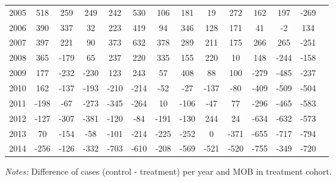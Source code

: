 \begin{table}[H]
\begin{threeparttable}
{\begin{tabular}{l*{13}{c}}
2005        &         518&         259&         249&         242&         530&         106&         181&          19&         272&         162&         197&        -269\\
2006        &         390&         337&          32&         223&         419&          94&         346&         128&         171&          41&          -2&         134\\
2007        &         397&         221&          90&         373&         632&         378&         289&         211&         175&         266&         265&        -251\\
2008        &         365&        -179&          65&         237&         220&         335&         155&         220&          10&         148&        -244&        -158\\
2009        &         177&        -232&        -230&         123&         243&          57&         408&          88&         100&        -279&        -485&        -237\\
2010        &         162&        -137&        -193&        -210&        -214&         -52&         -27&        -137&         -80&        -409&        -509&        -504\\
2011        &        -198&         -67&        -273&        -345&        -264&          10&        -106&         -47&          77&        -296&        -465&        -583\\
2012        &        -127&        -307&        -381&        -120&         -84&        -191&        -130&         244&          24&        -634&        -632&        -573\\
2013        &          70&        -154&         -58&        -101&        -214&        -225&        -252&           0&        -371&        -655&        -717&        -794\\
2014        &        -256&        -126&        -332&        -703&        -610&        -208&        -569&        -521&        -520&        -755&        -349&        -720\\
 \bottomrule \end{tabular} } \begin{tablenotes} \item \scriptsize \emph{Notes:} Difference of cases (control - treatment) per year and MOB in treatment cohort. \end{tablenotes} \end{threeparttable} \end{table} 
